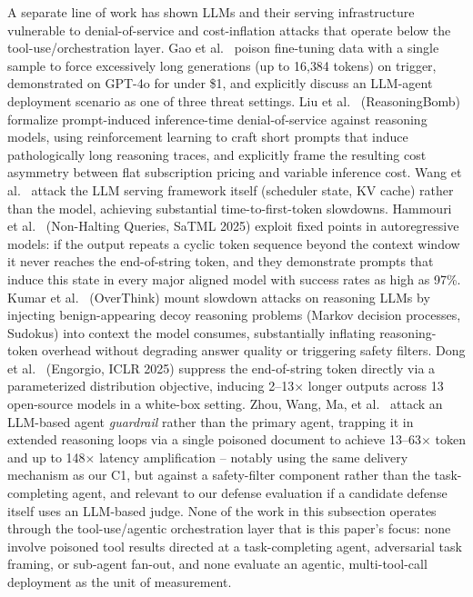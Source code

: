\documentclass[conference]{IEEEtran}
\begin{document}
A separate line of work has shown LLMs and their serving infrastructure vulnerable to denial-of-service and cost-inflation attacks that operate below the tool-use/orchestration layer. Gao et al.~\cite{gao2024dospoisoning} poison fine-tuning data with a single sample to force excessively long generations (up to 16{,}384 tokens) on trigger, demonstrated on GPT-4o for under \$1, and explicitly discuss an LLM-agent deployment scenario as one of three threat settings. Liu et al.~\cite{liu2026reasoningbomb} (ReasoningBomb) formalize prompt-induced inference-time denial-of-service against reasoning models, using reinforcement learning to craft short prompts that induce pathologically long reasoning traces, and explicitly frame the resulting cost asymmetry between flat subscription pricing and variable inference cost. Wang et al.~\cite{wang2026latencydos} attack the LLM serving framework itself (scheduler state, KV cache) rather than the model, achieving substantial time-to-first-token slowdowns. Hammouri et al.~\cite{bilal2026nonhalting} (Non-Halting Queries, SaTML 2025) exploit fixed points in autoregressive models: if the output repeats a cyclic token sequence beyond the context window it never reaches the end-of-string token, and they demonstrate prompts that induce this state in every major aligned model with success rates as high as 97\%. Kumar et al.~\cite{kumar2025overthink} (OverThink) mount slowdown attacks on reasoning LLMs by injecting benign-appearing decoy reasoning problems (Markov decision processes, Sudokus) into context the model consumes, substantially inflating reasoning-token overhead without degrading answer quality or triggering safety filters. Dong et al.~\cite{engorgio2024} (Engorgio, ICLR 2025) suppress the end-of-string token directly via a parameterized distribution objective, inducing 2--13$\times$ longer outputs across 13 open-source models in a white-box setting. Zhou, Wang, Ma, et al.~\cite{shieldtotarget2026} attack an LLM-based agent \emph{guardrail} rather than the primary agent, trapping it in extended reasoning loops via a single poisoned document to achieve 13--63$\times$ token and up to 148$\times$ latency amplification -- notably using the same delivery mechanism as our C1, but against a safety-filter component rather than the task-completing agent, and relevant to our defense evaluation if a candidate defense itself uses an LLM-based judge. None of the work in this subsection operates through the tool-use/agentic orchestration layer that is this paper's focus: none involve poisoned tool results directed at a task-completing agent, adversarial task framing, or sub-agent fan-out, and none evaluate an agentic, multi-tool-call deployment as the unit of measurement.
\end{document}
